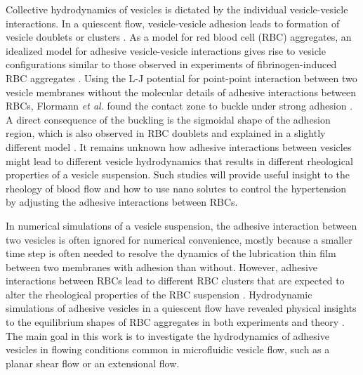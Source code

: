 \documentclass[prf,superscriptaddress,showpacs]{revtex4-1}
\begin{document}
%
%
Collective hydrodynamics of vesicles is dictated by the individual
vesicle-vesicle interactions.  
In a quiescent flow,
vesicle-vesicle adhesion leads to formation of vesicle doublets \cite{Ziherl2007_PRL,ZiherlSvetina2007_PNAS} or clusters \cite{SvetinaZiherl2008_Bioelectrochemistry,FlormannAouane2017_SciReports}.
As a model for red blood cell (RBC) aggregates, an idealized model for adhesive vesicle-vesicle interactions gives rise to 
vesicle configurations similar to those observed in experiments of fibrinogen-induced RBC aggregates \cite{SvetinaZiherl2008_Bioelectrochemistry,FlormannAouane2017_SciReports}. 
Using the L-J potential for point-point interaction between two vesicle membranes without the molecular details of
adhesive interactions between RBCs, Flormann {\it et al.} found the contact zone to buckle under strong adhesion \cite{FlormannAouane2017_SciReports}. 
A direct consequence of the buckling is the
sigmoidal shape of the adhesion region, which is also observed in RBC doublets and explained in a slightly different model \cite{ZiherlSvetina2007_PNAS}. 
It remains unknown how adhesive interactions between vesicles might lead to different vesicle hydrodynamics that results in
different rheological properties of a vesicle suspension. Such studies will provide useful insight to the rheology of blood flow and how to use nano solutes to control the hypertension
by adjusting the adhesive interactions between RBCs.
%

In numerical simulations of  a vesicle suspension, the adhesive interaction between two vesicles is often 
ignored \cite{Veerapaneni2009_JCP,RahimianVeerapaneniBiros2010_JCP} 
for numerical convenience, mostly 
because a smaller time step is often needed to resolve the dynamics of the lubrication thin film between two membranes with adhesion than without.
However, adhesive interactions  between RBCs lead to different RBC clusters that are expected to alter the rheological properties of the RBC suspension \cite{NeuMeiselman2002_BJ,SvetinaZiherl2008_Bioelectrochemistry}.
%
Hydrodynamic simulations of adhesive vesicles in a quiescent flow have revealed physical insights to the equilibrium shapes of RBC aggregates in both experiments 
\cite{FlormannAouane2017_SciReports} and theory \cite{ZiherlSvetina2007_PNAS}. The main goal in this work is to investigate the hydrodynamics of adhesive vesicles in flowing
conditions common in microfluidic vesicle flow, such as a planar shear flow or an extensional flow.
\end{document}
